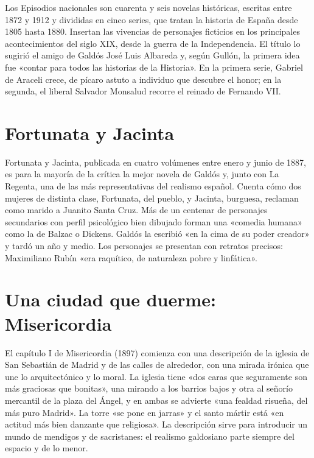 \documentclass{book}
\begin{document}
Los Episodios nacionales son cuarenta y seis novelas históricas, escritas entre 1872 y 1912 y divididas en cinco series, que tratan la historia de España desde 1805 hasta 1880. Insertan las vivencias de personajes ficticios en los principales acontecimientos del siglo XIX, desde la guerra de la Independencia. El título lo sugirió el amigo de Galdós José Luis Albareda y, según Gullón, la primera idea fue «contar para todos las historias de la Historia». En la primera serie, Gabriel de Araceli crece, de pícaro astuto a individuo que descubre el honor; en la segunda, el liberal Salvador Monsalud recorre el reinado de Fernando VII.


\section{Fortunata y Jacinta}

Fortunata y Jacinta, publicada en cuatro volúmenes entre enero y junio de 1887, es para la mayoría de la crítica la mejor novela de Galdós y, junto con La Regenta, una de las más representativas del realismo español. Cuenta cómo dos mujeres de distinta clase, Fortunata, del pueblo, y Jacinta, burguesa, reclaman como marido a Juanito Santa Cruz. Más de un centenar de personajes secundarios con perfil psicológico bien dibujado forman una «comedia humana» como la de Balzac o Dickens. Galdós la escribió «en la cima de su poder creador» y tardó un año y medio. Los personajes se presentan con retratos precisos: Maximiliano Rubín «era raquítico, de naturaleza pobre y linfática».


\section{Una ciudad que duerme: Misericordia}

El capítulo I de Misericordia (1897) comienza con una descripción de la iglesia de San Sebastián de Madrid y de las calles de alrededor, con una mirada irónica que une lo arquitectónico y lo moral. La iglesia tiene «dos caras que seguramente son más graciosas que bonitas», una mirando a los barrios bajos y otra al señorío mercantil de la plaza del Ángel, y en ambas se advierte «una fealdad risueña, del más puro Madrid». La torre «se pone en jarras» y el santo mártir está «en actitud más bien danzante que religiosa». La descripción sirve para introducir un mundo de mendigos y de sacristanes: el realismo galdosiano parte siempre del espacio y de lo menor.
\end{document}
